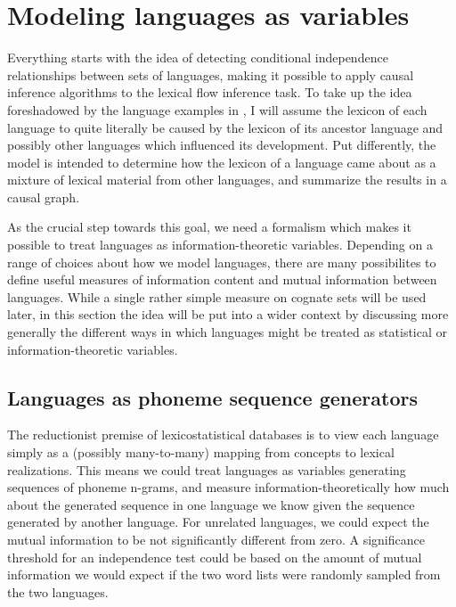 \section{Modeling languages as variables}\label{sec:6.1}
Everything starts with the idea of detecting conditional independence relationships between sets of languages, making it possible to apply causal inference algorithms to the lexical flow inference task. To take up the idea foreshadowed by the language examples in , I will assume the lexicon of each language to quite literally be caused by the lexicon of its ancestor language and possibly other languages which influenced its development. Put differently, the model is intended to determine how the lexicon of a language came about as a mixture of lexical material from other languages, and summarize the results in a causal graph.

As the crucial step towards this goal, we need a formalism which makes it possible to treat languages as information-theoretic variables. Depending on a range of choices about how we model languages, there are many possibilites to define useful measures of information content and mutual information between languages. While a single rather simple measure on cognate sets will be used later, in this section the idea will be put into a wider context by discussing more generally the different ways in which languages might be treated as statistical or information-theoretic variables.

\subsection{Languages as phoneme sequence generators}\label{sec:6.1.1}
The reductionist premise of lexicostatistical databases is to view each language simply as a (possibly many-to-many) mapping from concepts to lexical realizations. This means we could treat languages as variables generating sequences of phoneme n-grams, and measure information-theoretically how much about the generated sequence in one language we know given the sequence generated by another language. For unrelated languages, we could expect the mutual information to be not significantly different from zero. A significance threshold for an independence test could be based on the amount of mutual information we would expect if the two word lists were randomly sampled from the two languages.

